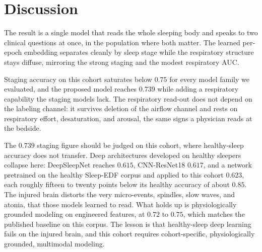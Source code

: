 \documentclass{ieeeaccess}
\newcommand{\mmAcc}{0.739}   %
\newcommand{\stale}[1]{\textcolor{red}{#1}}
\begin{document}
%
%
%

\section{Discussion}
The result is a single model that reads the whole sleeping body and speaks to two clinical
questions at once, in the population where both matter. The learned per-epoch embedding separates cleanly by sleep stage while the
respiratory structure stays diffuse, mirroring the strong staging and the modest
respiratory AUC.

 Staging accuracy on this cohort saturates
below $0.75$ for every model family we evaluated, and the proposed model reaches $\mmAcc$ while
adding a respiratory capability the staging models lack. The respiratory
read-out does not depend on the labeling channel: it survives deletion of the airflow channel and
rests on respiratory effort, desaturation, and arousal, the same signs a physician reads at the
bedside.

The $\mmAcc$ staging figure should be judged on this cohort, where healthy-sleep accuracy does not transfer. Deep
architectures developed on healthy sleepers collapse here: DeepSleepNet reaches $0.615$,
CNN-ResNet18 $0.617$, and a network pretrained on the healthy Sleep-EDF corpus and applied to
this cohort $0.623$, each roughly fifteen to twenty points below its healthy accuracy of about
$0.85$. The injured brain distorts the very micro-events, spindles, slow waves, and atonia, that
those models learned to read. What holds up is physiologically grounded modeling on engineered
features, at $0.72$ to $0.75$, which matches the published baseline on this corpus. The lesson is
that healthy-sleep deep learning fails on the injured brain, and this cohort requires
cohort-specific, physiologically grounded, multimodal modeling.
\end{document}

